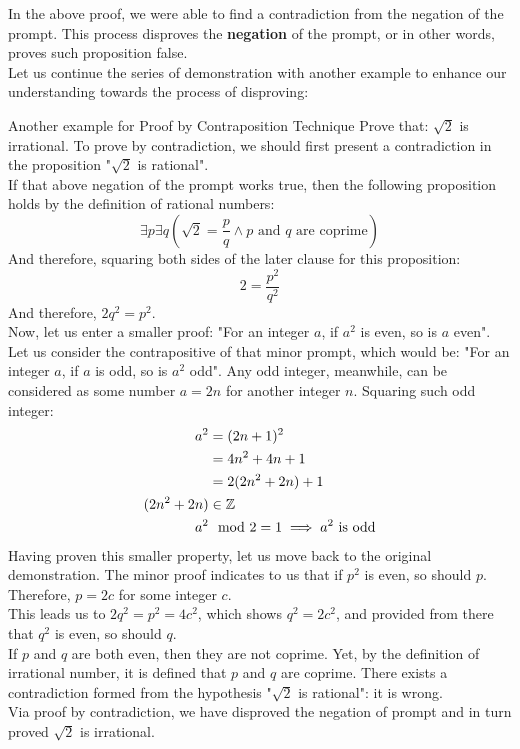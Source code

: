 In the above proof, we were able to find a contradiction from the negation of the prompt. This process disproves the \textbf{negation} of the prompt, or in other words, proves such proposition false. \\
Let us continue the series of demonstration with another example to enhance our understanding towards the process of disproving:
\begin{ln-think}{Another example for Proof by Contraposition Technique}{}
    Prove that: $\sqrt{2}$ is irrational.
    \tcblower
    To prove by contradiction, we should first present a contradiction in the proposition "$\sqrt{2}$ is rational". \\
    If that above negation of the prompt works true, then the following proposition holds by the definition of rational numbers:
    \[\exists p \exists q (\sqrt{2} = \frac{p}{q} \land \text{$p$ and $q$ are coprime})\]
    And therefore, squaring both sides of the later clause for this proposition:
    \[2 = \frac{p^2}{q^2}\]
    And therefore, $2q^2 = p^2$. \\
    Now, let us enter a smaller proof: "For an integer $a$, if $a^2$ is even, so is $a$ even". \\
    Let us consider the contrapositive of that minor prompt, which would be: "For an integer $a$, if $a$ is odd, so is $a^2$ odd". Any odd integer, meanwhile, can be considered as some number $a = 2n$ for another integer $n$. Squaring such odd integer:
    \begin{align*}
        a^2 &= (2n + 1)^2 \\
        &= 4n^2 + 4n + 1 \\
        &= 2(2n^2 + 2n) + 1 \\
        (2n^2 + 2n) &\in \mathbb{Z} \\
        a^2 &\mod 2 = 1 \implies \text{$a^2$ is odd}
    \end{align*}
    Having proven this smaller property, let us move back to the original demonstration. The minor proof indicates to us that if $p^2$ is even, so should $p$. Therefore, $p = 2c$ for some integer $c$.\\
    This leads us to $2q^2 = p^2 = 4c^2$, which shows $q^2 = 2c^2$, and provided from there that $q^2$ is even, so should $q$. \\
    If $p$ and $q$ are both even, then they are not coprime. Yet, by the definition of irrational number, it is defined that $p$ and $q$ are coprime. There exists a contradiction formed from the hypothesis "$\sqrt{2}$ is rational": it is wrong. \\
    Via proof by contradiction, we have disproved the negation of prompt and in turn proved $\sqrt{2}$ is irrational. 
\end{ln-think}

